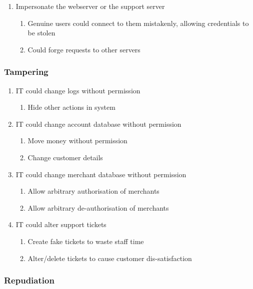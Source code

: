 \begin{enumerate}
    \item \label{impersonateWebserver} Impersonate the webserver or the support server
    \begin{enumerate}
        \item Genuine users could connect to them mistakenly, allowing credentials to be stolen
        \item Could forge requests to other servers
    \end{enumerate}
\end{enumerate}

\subsubsection{Tampering}

\begin{enumerate}[resume]
    \item IT could change logs without permission
    \begin{enumerate}
        \item Hide other actions in system
    \end{enumerate}

    \item IT could change account database without permission
    \begin{enumerate}
        \item Move money without permission
        \item Change customer details
    \end{enumerate}

    \item IT could change merchant database without permission
    \begin{enumerate}
        \item Allow arbitrary authorisation of merchants
        \item Allow arbitrary de-authorisation of merchants
    \end{enumerate}

    \item IT could alter support tickets
    \begin{enumerate}
        \item Create fake tickets to waste staff time
        \item Alter/delete tickets to cause customer dis-satisfaction
    \end{enumerate}
\end{enumerate}

\subsubsection{Repudiation}


